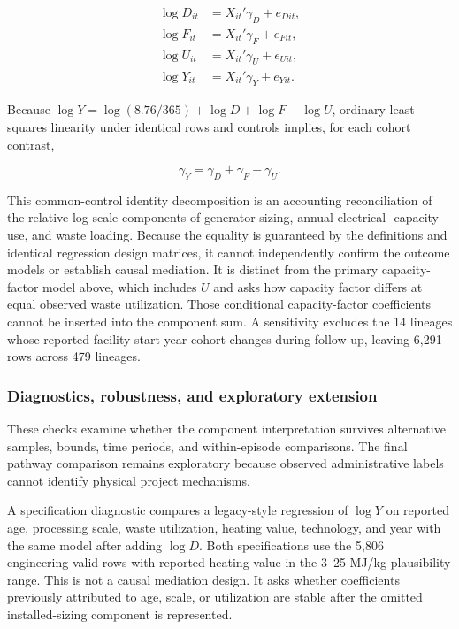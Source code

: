 \documentclass[12pt,a4paper]{article}
\begin{document}
\begin{equation}
\begin{aligned}
\log D_{it}&=X_{it}'\gamma_D+e_{Dit},\\
\log F_{it}&=X_{it}'\gamma_F+e_{Fit},\\
\log U_{it}&=X_{it}'\gamma_U+e_{Uit},\\
\log Y_{it}&=X_{it}'\gamma_Y+e_{Yit}.
\end{aligned}
\label{eq:common-control-components}
\end{equation}

Because $\log Y=\log(8.76/365)+\log D+\log F-\log U$, ordinary least-squares
linearity under identical rows and controls implies, for each cohort contrast,

\begin{equation}
\gamma_Y=\gamma_D+\gamma_F-\gamma_U.
\label{eq:common-control-identity}
\end{equation}

This common-control identity decomposition is an accounting reconciliation of
the relative log-scale components of generator sizing, annual electrical-
capacity use, and waste loading. Because the equality is guaranteed by the
definitions and identical regression design matrices, it cannot independently
confirm the outcome models or establish causal mediation. It is distinct from
the primary capacity-factor model above, which
includes $U$ and asks how capacity factor differs at equal observed waste
utilization. Those conditional capacity-factor coefficients cannot be inserted
into the component sum. A sensitivity excludes the 14 lineages whose reported
facility start-year cohort changes during follow-up, leaving 6,291 rows across 479
lineages.

\subsubsection{Diagnostics, robustness, and exploratory extension}

These checks examine whether the component interpretation survives alternative
samples, bounds, time periods, and within-episode comparisons. The final
pathway comparison remains exploratory because observed administrative labels
cannot identify physical project mechanisms.

A specification diagnostic compares a legacy-style regression of $\log Y$ on
reported age, processing scale, waste utilization, heating value, technology,
and year with the same model after adding $\log D$. Both specifications use the
5,806 engineering-valid rows with reported heating value in the 3--25 MJ/kg
plausibility range. This is not a causal mediation design. It asks whether
coefficients previously attributed to age, scale, or utilization are stable
after the omitted installed-sizing component is represented.
\end{document}
